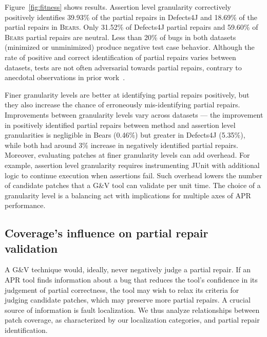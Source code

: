 \documentclass[10pt, conference]{IEEEtran}
\newcommand\bears{\textsc{Bears}\xspace}
\begin{document}
Figure~\ref{fig:fitness} shows results.
Assertion level granularity correctively positively identifies
39.93\% of the partial repairs in Defects4J
and 18.69\% of the partial repairs in \bears.
Only 31.52\% of Defects4J partial repairs and 
59.60\% 
of \bears partial repairs are neutral. Less than 20\% of bugs in both datasets
(minimized or unminimized) produce negative test case behavior.
Although the rate of positive and correct identification of partial repairs varies between datasets,
tests are not often adversarial towards partial repairs, contrary to anecdotal
observations in prior work~\cite{gecco09}.

Finer granularity levels are better at identifying partial repairs positively,
but they also increase the chance of erroneously mis-identifying partial repairs.
Improvements between granularity levels vary across datasets --- the improvement 
in positively identified partial repairs between method and assertion level granularities
is negligible in Bears (0.46\%) but greater in Defects4J (5.35\%), while both had around 3\% increase in negatively identified partial repairs.
Moreover, evaluating patches at finer granularity levels can add overhead.
For example, assertion level granularity requires instrumenting JUnit with additional
logic to continue execution when assertions fail.
Such overhead lowers the number of
candidate patches that a G\&V tool can validate per unit time.
The choice of a granularity level is a balancing act with implications for
multiple axes of APR performance.

\subsection{Coverage's influence on partial repair validation}

A G\&V technique would, ideally, never negatively judge a partial repair.
If an APR tool finds information about a bug that reduces the tool's 
confidence in its judgement of partial correctness, the tool may wish to 
relax its criteria for judging candidate patches, 
which may preserve more partial repairs.
A crucial source of information is fault localization.
We thus analyze relationships between patch coverage, as 
characterized by our localization categories, 
and partial repair identification.

\end{document}
